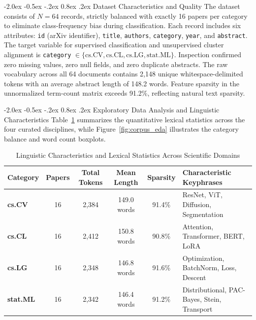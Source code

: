 \documentclass[12pt,a4paper]{report}
\makeatletter
\renewcommand\section{\@startsection {section}{1}{\z@}%
                                   {-2.0ex \@plus -0.5ex \@minus -.2ex}%
                                   {0.8ex \@plus.2ex}%
                                   {\normalfont\fontsize{14}{17}\bfseries\color{headerblue}}}
\makeatother
\begin{document}
\section{Dataset Characteristics and Quality}
The dataset consists of $N = 64$ records, strictly balanced with exactly 16 papers per category to eliminate class-frequency bias during classification. Each record includes six attributes: \texttt{id} (arXiv identifier), \texttt{title}, \texttt{authors}, \texttt{category}, \texttt{year}, and \texttt{abstract}. The target variable for supervised classification and unsupervised cluster alignment is \texttt{category} $\in \{\text{cs.CV}, \text{cs.CL}, \text{cs.LG}, \text{stat.ML}\}$. Inspection confirmed zero missing values, zero null fields, and zero duplicate abstracts. The raw vocabulary across all 64 documents contains 2,148 unique whitespace-delimited tokens with an average abstract length of 148.2 words. Feature sparsity in the unnormalized term-count matrix exceeds 91.2\%, reflecting natural text sparsity.

\section{Exploratory Data Analysis and Linguistic Characteristics}
Table~\ref{tab:corpus_stats} summarizes the quantitative lexical statistics across the four curated disciplines, while Figure~\ref{fig:corpus_eda} illustrates the category balance and word count boxplots.

\begin{table}[!ht]
\centering
\caption[Linguistic Characteristics of Corpus]{Linguistic Characteristics and Lexical Statistics Across Scientific Domains}
\label{tab:corpus_stats}
\small
\begin{tabular}{|l|c|c|c|c|p{4.2cm}|}
\hline
\textbf{Category} & \textbf{Papers} & \textbf{Total Tokens} & \textbf{Mean Length} & \textbf{Sparsity} & \textbf{Characteristic Keyphrases} \\ \hline
\textbf{cs.CV} & 16 & 2,384 & 149.0 words & 91.4\% & ResNet, ViT, Diffusion, Segmentation \\ \hline
\textbf{cs.CL} & 16 & 2,412 & 150.8 words & 90.8\% & Attention, Transformer, BERT, LoRA \\ \hline
\textbf{cs.LG} & 16 & 2,348 & 146.8 words & 91.6\% & Optimization, BatchNorm, Loss, Descent \\ \hline
\textbf{stat.ML} & 16 & 2,342 & 146.4 words & 91.2\% & Distributional, PAC-Bayes, Stein, Transport \\ \hline
\end{tabular}
\end{table}
\end{document}
